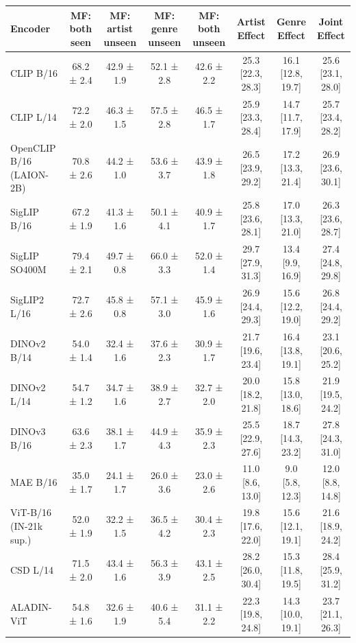 \begin{tabular}{lccccccc}
\toprule
Encoder & MF: both seen & MF: artist unseen & MF: genre unseen & MF: both unseen & Artist Effect & Genre Effect & Joint Effect \\
\midrule
CLIP B/16 & 68.2 ± 2.4 & 42.9 ± 1.9 & 52.1 ± 2.8 & 42.6 ± 2.2 & 25.3 [22.3, 28.3] & 16.1 [12.8, 19.7] & 25.6 [23.1, 28.0] \\
CLIP L/14 & 72.2 ± 2.0 & 46.3 ± 1.5 & 57.5 ± 2.8 & 46.5 ± 1.7 & 25.9 [23.3, 28.4] & 14.7 [11.7, 17.9] & 25.7 [23.4, 28.2] \\
OpenCLIP B/16 (LAION-2B) & 70.8 ± 2.6 & 44.2 ± 1.0 & 53.6 ± 3.7 & 43.9 ± 1.8 & 26.5 [23.9, 29.2] & 17.2 [13.3, 21.4] & 26.9 [23.6, 30.1] \\
SigLIP B/16 & 67.2 ± 1.9 & 41.3 ± 1.6 & 50.1 ± 4.1 & 40.9 ± 1.7 & 25.8 [23.6, 28.1] & 17.0 [13.3, 21.0] & 26.3 [23.6, 28.7] \\
SigLIP SO400M & 79.4 ± 2.1 & 49.7 ± 0.8 & 66.0 ± 3.3 & 52.0 ± 1.4 & 29.7 [27.9, 31.3] & 13.4 [9.9, 16.9] & 27.4 [24.8, 29.8] \\
SigLIP2 L/16 & 72.7 ± 2.6 & 45.8 ± 0.8 & 57.1 ± 3.0 & 45.9 ± 1.6 & 26.9 [24.4, 29.3] & 15.6 [12.2, 19.0] & 26.8 [24.4, 29.2] \\
DINOv2 B/14 & 54.0 ± 1.4 & 32.4 ± 1.6 & 37.6 ± 2.3 & 30.9 ± 1.7 & 21.7 [19.6, 23.4] & 16.4 [13.8, 19.1] & 23.1 [20.6, 25.2] \\
DINOv2 L/14 & 54.7 ± 1.2 & 34.7 ± 1.6 & 38.9 ± 2.7 & 32.7 ± 2.0 & 20.0 [18.2, 21.8] & 15.8 [13.0, 18.6] & 21.9 [19.5, 24.2] \\
DINOv3 B/16 & 63.6 ± 2.3 & 38.1 ± 1.7 & 44.9 ± 4.3 & 35.9 ± 2.3 & 25.5 [22.9, 27.6] & 18.7 [14.3, 23.2] & 27.8 [24.3, 31.0] \\
MAE B/16 & 35.0 ± 1.7 & 24.1 ± 1.7 & 26.0 ± 3.6 & 23.0 ± 2.6 & 11.0 [8.6, 13.0] & 9.0 [5.8, 12.3] & 12.0 [8.8, 14.8] \\
ViT-B/16 (IN-21k sup.) & 52.0 ± 1.9 & 32.2 ± 1.5 & 36.5 ± 4.2 & 30.4 ± 2.3 & 19.8 [17.6, 22.0] & 15.6 [12.1, 19.1] & 21.6 [18.9, 24.2] \\
CSD L/14 & 71.5 ± 2.0 & 43.4 ± 1.6 & 56.3 ± 3.9 & 43.1 ± 2.5 & 28.2 [26.0, 30.4] & 15.3 [11.8, 19.5] & 28.4 [25.9, 31.2] \\
ALADIN-ViT & 54.8 ± 1.6 & 32.6 ± 1.9 & 40.6 ± 5.4 & 31.1 ± 2.2 & 22.3 [19.8, 24.8] & 14.3 [10.0, 19.1] & 23.7 [21.1, 26.3] \\
\bottomrule
\end{tabular}

